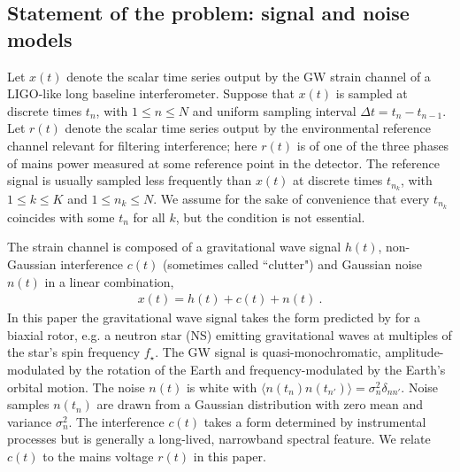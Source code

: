 \documentclass[pra,superscriptaddress,reprint,amsmath,amssymb,nofootinbib]{revtex4-2}
\providecommand{\DIFdelbegin}{} %
\providecommand{\DIFdelend}{} %
\newcommand{\DIFscaledelfig}{0.5}
\newlength{\DIFdelgraphicswidth} %
\newlength{\DIFdelgraphicsheight} %
\newcommand{\DIFdelincludegraphics}[2][]{%
\sbox{\DIFdelgraphicsbox}{\DIFOincludegraphics[#1]{#2}}%
\settoboxwidth{\DIFdelgraphicswidth}{\DIFdelgraphicsbox} %
\settoboxtotalheight{\DIFdelgraphicsheight}{\DIFdelgraphicsbox} %
\scalebox{\DIFscaledelfig}{%
\parbox[b]{\DIFdelgraphicswidth}{\usebox{\DIFdelgraphicsbox}\\[-\baselineskip] \rule{\DIFdelgraphicswidth}{0em}}\llap{\resizebox{\DIFdelgraphicswidth}{\DIFdelgraphicsheight}{%
\setlength{\unitlength}{\DIFdelgraphicswidth}%
\begin{picture}(1,1)%
\thicklines\linethickness{2pt} %
{\color[rgb]{1,0,0}\put(0,0){\framebox(1,1){}}}%
{\color[rgb]{1,0,0}\put(0,0){\line( 1,1){1}}}%
{\color[rgb]{1,0,0}\put(0,1){\line(1,-1){1}}}%
\end{picture}%
}\hspace*{3pt}}} %
} %
\DeclareRobustCommand{\DIFdelbegin}{\DIFOdelbegin \let\includegraphics\DIFdelincludegraphics} %
\DeclareRobustCommand{\DIFdelend}{\DIFOaddend \let\includegraphics\DIFOincludegraphics} %
\begin{document}
\DIFdelbegin %

\DIFdelend %
\subsection{Statement of the problem: signal and noise models}  \label{sec21}
Let $x(t)$ denote the scalar time series output by the GW strain channel of a LIGO-like long baseline interferometer. Suppose that $x(t)$ is sampled at discrete times $t_n$, with $1 \leq n \leq N$ and uniform sampling interval $\Delta t = t_n - t_{n-1}$. Let $r(t)$ denote the scalar time series output by the environmental reference channel relevant for filtering interference; here $r(t)$ is of one of the three phases of mains power measured at some reference point in the detector. The reference signal is usually sampled less frequently than $x(t)$ at discrete times $t_{n_k}$, with $1 \leq k \leq K$ and $1 \leq n_k \leq N$. We assume for the sake of convenience that every $t_{n_k}$ coincides with some $t_n$ for all $k$, but the condition is not essential. \newline 

The strain channel is composed of a gravitational wave signal $h(t)$, non-Gaussian interference $c(t)$ (sometimes called ``clutter") and Gaussian noise $n(t)$ in a linear combination,
\begin{eqnarray}
	x(t) = h(t) + c(t) + n(t) \ .
	\label{eq:data}
\end{eqnarray}
 In this paper the gravitational wave signal takes the form predicted by \citet{Jaranowski1998} for a biaxial rotor, e.g. a neutron star (NS) emitting gravitational waves at multiples of the star's spin frequency $f_{\star}$. The GW signal is quasi-monochromatic, amplitude-modulated by the rotation of the Earth and frequency-modulated by the Earth's orbital motion. The noise $n(t)$ is white with $\langle n(t_n) n(t_{n'})\rangle = \sigma_n^2 \delta_{n n'}$. Noise samples $n(t_n)$ are drawn from a Gaussian distribution with zero mean and variance $\sigma_n^2$. The interference $c(t)$ takes a form determined by instrumental processes but is generally a long-lived, narrowband spectral feature. We relate $c(t)$ to the mains voltage $r(t)$ in this paper. \newline 
\end{document}
